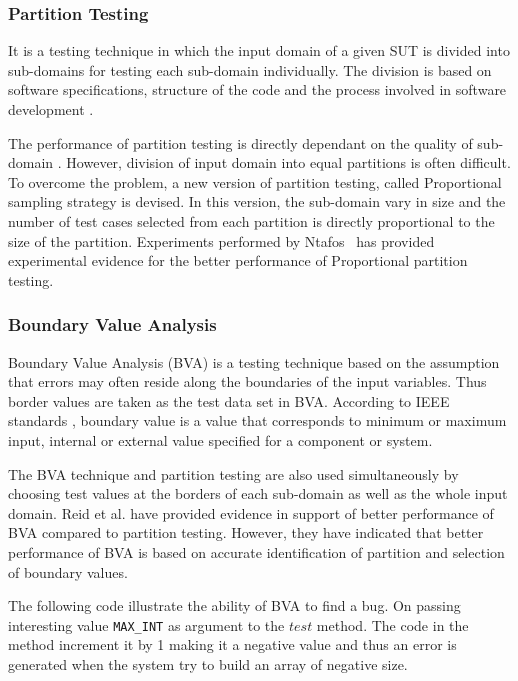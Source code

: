 \subsubsection{Partition Testing}
It is a testing technique in which the input domain of a given SUT is divided into sub-domains for testing each sub-domain individually. The division is based on software specifications, structure of the code and the process involved in software development \cite{hamlet1990}. 

The performance of partition testing is directly dependant on the quality of sub-domain \cite{weyuker1991analyzing}. However, division of input domain into equal partitions is often difficult. To overcome the problem, a new version of partition testing, called Proportional sampling strategy \cite{Chan1996} is devised. In this version, the sub-domain vary in size and the number of test cases selected from each partition is directly proportional to the size of the partition. Experiments performed by Ntafos~\cite{ntafos1998random} has provided experimental evidence for the better performance of Proportional partition testing.


\subsubsection{Boundary Value Analysis}
Boundary Value Analysis (BVA) is a testing technique based on the assumption that errors may often reside along the boundaries of the input variables. Thus border values are taken as the test data set in BVA. According to IEEE standards \cite{radatz1990ieee}, boundary value is a value that corresponds to minimum or maximum input, internal or external value specified for a component or system. 

The BVA technique and partition testing are also used simultaneously by choosing test values at the borders of each sub-domain as well as the whole input domain. Reid et al. \cite{reid1997empirical} have provided evidence in support of better performance of BVA compared to partition testing. However, they have indicated that better performance of BVA is based on accurate identification of partition and selection of boundary values.

 The following code illustrate the ability of BVA to find a bug.  On passing interesting value \verb+MAX_INT+ as argument to the $test$ method. The code in the method increment it by 1 making it a negative value and thus an error is generated when the system try to build an array of negative size.


